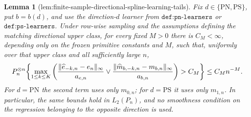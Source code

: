 \documentclass{article}
\newtheorem{lemma}{Lemma}
\begin{document}
\begin{lemma}[lem:finite-sample-directional-spline-learning-tails]\label{lem:finite-sample-directional-spline-learning-tails}
Fix \(d\in\{\mathrm{PN},\mathrm{PS}\}\), put \(b=b(d)\), and use the direction-\(d\) learner from \(\texttt{def:pn-learners}\) or \(\texttt{def:ps-learners}\). Under row-wise sampling and the assumptions defining the matching directional upper class, for every fixed \(M>0\) there is \(C_M<\infty\), depending only on the frozen primitive constants and \(M\), such that, uniformly over that upper class and all sufficiently large \(n\),
\[
\makebox[\linewidth][c]{\resizebox{0.98\linewidth}{!}{\(\displaystyle P_n^{\otimes n}\!\left\{\max_{1\le k\le K}
\left(
\frac{\lVert\widehat e_{-k,n}-e_n\rVert_\infty}{a_{e,n}}
\vee
\frac{\lVert\widehat m_{b,-k,n}-m_{b,n}\rVert_\infty}{a_{b,n}}
\right)>C_M\right\}\le C_Mn^{-M}.\)}}
\]
For \(d=\mathrm{PN}\) the second term uses only \(m_{0,n}\); for \(d=\mathrm{PS}\) it uses only \(m_{1,n}\). In particular, the same bounds hold in \(L_2(P_n)\), and no smoothness condition on the regression belonging to the opposite direction is used.
\end{lemma}
\end{document}
